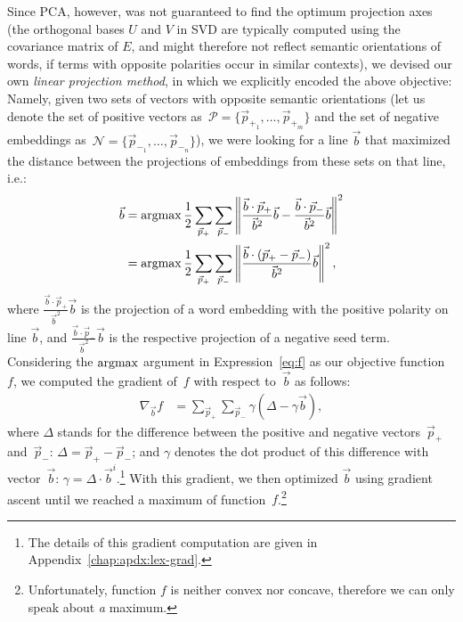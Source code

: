 Since PCA, however, was not guaranteed to find the optimum projection
axes (the orthogonal bases $U$ and $V$ in SVD are typically computed
using the covariance matrix of $E$, and might therefore not reflect
semantic orientations of words, if terms with opposite polarities
occur in similar contexts), we devised our own \emph{linear projection
  method}, in which we explicitly encoded the above objective: Namely,
given two sets of vectors with opposite semantic orientations (let us
denote the set of positive vectors as~$\mathcal{P} =
\{\vec{p}_{+_1},\ldots,\vec{p}_{+_m}\}$ and the set of negative
embeddings as~$\mathcal{N} = \{\vec{p}_{-_1},\ldots,\vec{p}_{-_n}\}$),
we were looking for a line $\vec{b}$ that maximized the distance
between the projections of embeddings from these sets on that line, i.e.: {\small%
  \begin{align}
    \begin{split}
      \small
      \vec{b} &=\argmax\frac{1}{2}\sum_{\vec{p}_+}\sum_{\vec{p}_-}%
      \left\lVert\frac{\vec{b}\cdot\vec{p}_+}{\vec{b}^2}\vec{b}%
      - \frac{\vec{b}\cdot\vec{p}_-}{\vec{b}^2}\vec{b}\right\rVert^2\\
      &=\argmax\frac{1}{2}\sum_{\vec{p}_+}\sum_{\vec{p}_-}\left\lVert\frac{\vec{b}%
        \cdot\left(\vec{p}_{+}-\vec{p}_{-}\right)}{\vec{b}^2}\vec{b}\right\rVert^2,\label{eq:f}%
    \end{split}
  \end{align}\normalsize}%
where $\frac{\vec{b}\cdot\vec{p}_+}{\vec{b}^2}\vec{b}$ is the
projection of a word embedding with the positive polarity on line
$\vec{b}$, and $\frac{\vec{b}\cdot\vec{p}_-}{\vec{b}^2}\vec{b}$ is the
respective projection of a negative seed term.  Considering the
$\argmax$ argument in Expression~\ref{eq:f} as our objective
function~$f$, we computed the gradient of~$f$ with respect
to~$\vec{b}$ as follows: {\small%
  \begin{align}
    \nabla_{\vec{b}} f &= \sum_{\vec{p}_+}\sum_{\vec{p}_-}%
               \gamma\left(\Delta - \gamma\vec{b}\right),\label{eq:prj-line-grad}%
\end{align}\normalsize}%
where $\Delta$ stands for the difference between the positive and
negative vectors~$\vec{p}_{+}$ and~$\vec{p}_{-}$: $\Delta =
\vec{p}_{+}-\vec{p}_{-}$; and $\gamma$ denotes the dot product of this
difference with vector~$\vec{b}$: $\gamma = \Delta \cdot
\vec{b}^i$.\footnote{The details of this gradient computation are
  given in Appendix~\ref{chap:apdx:lex-grad}.}  With this gradient, we
then optimized $\vec{b}$ using gradient ascent until we reached a
maximum of function~$f$.\footnote{Unfortunately, function $f$ is
  neither convex nor concave, therefore we can only speak about
  \emph{a} maximum.}

